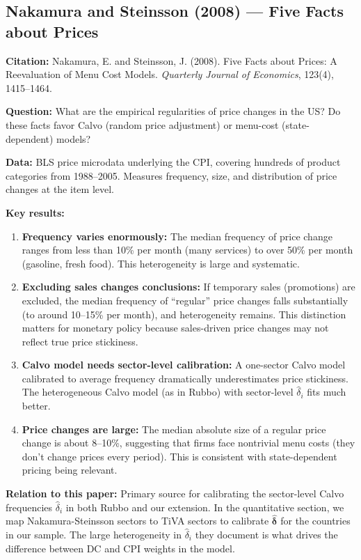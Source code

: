 \documentclass[12pt]{article}
\begin{document}
\subsection{Nakamura and Steinsson (2008) --- Five Facts about Prices}

\textbf{Citation:} Nakamura, E. and Steinsson, J. (2008). Five Facts about Prices: A Reevaluation of Menu Cost Models. \textit{Quarterly Journal of Economics}, 123(4), 1415--1464.

\textbf{Question:} What are the empirical regularities of price changes in the US? Do these facts favor Calvo (random price adjustment) or menu-cost (state-dependent) models?

\textbf{Data:} BLS price microdata underlying the CPI, covering hundreds of product categories from 1988--2005. Measures frequency, size, and distribution of price changes at the item level.

\textbf{Key results:}
\begin{enumerate}
    \item \textbf{Frequency varies enormously:} The median frequency of price change ranges from less than 10\% per month (many services) to over 50\% per month (gasoline, fresh food). This heterogeneity is large and systematic.
    \item \textbf{Excluding sales changes conclusions:} If temporary sales (promotions) are excluded, the median frequency of ``regular'' price changes falls substantially (to around 10--15\% per month), and heterogeneity remains. This distinction matters for monetary policy because sales-driven price changes may not reflect true price stickiness.
    \item \textbf{Calvo model needs sector-level calibration:} A one-sector Calvo model calibrated to average frequency dramatically underestimates price stickiness. The heterogeneous Calvo model (as in Rubbo) with sector-level $\hat{\delta}_i$ fits much better.
    \item \textbf{Price changes are large:} The median absolute size of a regular price change is about 8--10\%, suggesting that firms face nontrivial menu costs (they don't change prices every period). This is consistent with state-dependent pricing being relevant.
\end{enumerate}

\textbf{Relation to this paper:} Primary source for calibrating the sector-level Calvo frequencies $\hat{\delta}_i$ in both Rubbo and our extension. In the quantitative section, we map Nakamura-Steinsson sectors to TiVA sectors to calibrate $\hat{\bm{\delta}}$ for the countries in our sample. The large heterogeneity in $\hat{\delta}_i$ they document is what drives the difference between DC and CPI weights in the model.
\end{document}
